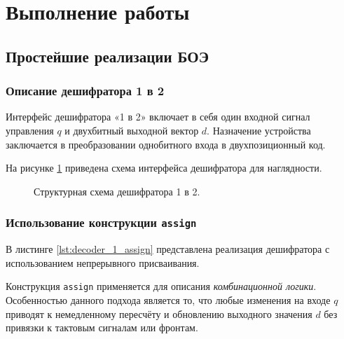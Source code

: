 \section{Выполнение работы}

\subsection{Простейшие реализации БОЭ}

\subsubsection{Описание дешифратора 1 в 2}

Интерфейс дешифратора «1 в 2» включает в себя один входной сигнал управления $q$ и двухбитный выходной вектор $d$. Назначение устройства заключается в преобразовании однобитного входа в двухпозиционный код. 

На рисунке \ref{fig:decoder_1_to_2} приведена схема интерфейса дешифратора для наглядности.

\begin{figure}[!hbp]
\centering
{}
\caption{Структурная схема дешифратора 1 в 2.}
\label{fig:decoder_1_to_2}
\end{figure}

\subsubsection{Использование конструкции \texttt{assign}}

В листинге \ref{lst:decoder_1_assign} представлена реализация дешифратора с использованием непрерывного присваивания. 

Конструкция \texttt{assign} применяется для описания \textit{комбинационной логики}. Особенностью данного подхода является то, что любые изменения на входе $q$ приводят к немедленному пересчёту и обновлению выходного значения $d$ без привязки к тактовым сигналам или фронтам.

